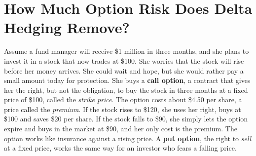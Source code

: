 \makeatletter
{}
\makeatother

\makeatletter
\makeatother

\chapter{How Much Option Risk Does Delta Hedging Remove?}
\label{ch:18}
\providecommand{\term}[1]{\emph{#1}}

Assume a fund manager will receive \$1 million in three months, and she plans to invest it in a stock that now trades at \$100. She worries that the stock will rise before her money arrives. She could wait and hope, but she would rather pay a small amount today for protection. She buys a \textbf{call option}, a contract that gives her the right, but not the obligation, to buy the stock in three months at a fixed price of \$100, called the \term{strike price}. The option costs about \$4.50 per share, a price called the \term{premium}. If the stock rises to \$120, she uses her right, buys at \$100 and saves \$20 per share. If the stock falls to \$90, she simply lets the option expire and buys in the market at \$90, and her only cost is the premium. The option works like insurance against a rising price. A \textbf{put option}, the right to \emph{sell} at a fixed price, works the same way for an investor who fears a falling price.

